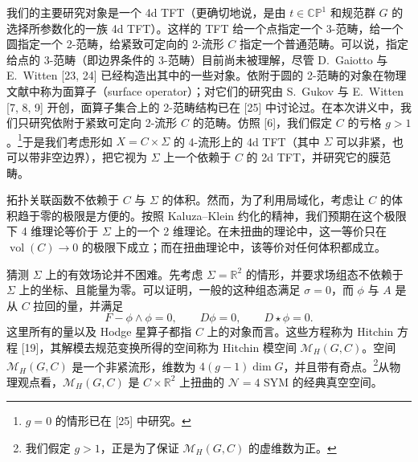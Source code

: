 \documentclass[11pt,a4paper,UTF8]{ctexart}
\begin{document}
我们的主要研究对象是一个 4d TFT（更确切地说，是由 $t\in\mathbb{CP}^{1}$ 和规范群 $G$ 的选择所参数化的一族 4d TFT）。这样的 TFT 给一个点指定一个 3-范畴，给一个圆指定一个 2-范畴，给紧致可定向的 2-流形 $C$ 指定一个普通范畴。可以说，指定给点的 3-范畴（即边界条件的 3-范畴）目前尚未被理解，尽管 D.~Gaiotto 与 E.~Witten [23, 24] 已经构造出其中的一些对象。依附于圆的 2-范畴的对象在物理文献中称为面算子（surface operator）；对它们的研究由 S.~Gukov 与 E.~Witten [7, 8, 9] 开创，面算子集合上的 2-范畴结构已在 [25] 中讨论过。在本次讲义中，我们只研究依附于紧致可定向 2-流形 $C$ 的范畴。仿照 [6]，我们假定 $C$ 的亏格 $g>1$。\footnote{$g=0$ 的情形已在 [25] 中研究。}于是我们考虑形如 $X=C\times\Sigma$ 的 4-流形上的 4d TFT（其中 $\Sigma$ 可以非紧，也可以带非空边界），把它视为 $\Sigma$ 上一个依赖于 $C$ 的 2d TFT，并研究它的膜范畴。


拓扑关联函数不依赖于 $C$ 与 $\Sigma$ 的体积。然而，为了利用局域化，考虑让 $C$ 的体积趋于零的极限是方便的。按照 Kaluza--Klein 约化的精神，我们预期在这个极限下 4 维理论等价于 $\Sigma$ 上的一个 2 维理论。在未扭曲的理论中，这一等价只在 $\operatorname{vol}(C)\to0$ 的极限下成立；而在扭曲理论中，该等价对任何体积都成立。


猜测 $\Sigma$ 上的有效场论并不困难。先考虑 $\Sigma=\mathbb{R}^{2}$ 的情形，并要求场组态不依赖于 $\Sigma$ 上的坐标、且能量为零。可以证明，一般的这种组态满足 $\sigma=0$，而 $\phi$ 与 $A$ 是从 $C$ 拉回的量，并满足
\[
    F-\phi\wedge\phi=0,\qquad D\phi=0,\qquad D\star\phi=0.
\]
这里所有的量以及 Hodge 星算子都指 $C$ 上的对象而言。这些方程称为 Hitchin 方程 [19]，其解模去规范变换所得的空间称为 Hitchin 模空间 $\mathcal{M}_{H}(G,C)$。空间 $\mathcal{M}_{H}(G,C)$ 是一个非紧流形，维数为 $4(g-1)\dim G$，并且带有奇点。\footnote{我们假定 $g>1$，正是为了保证 $\mathcal{M}_{H}(G,C)$ 的虚维数为正。}从物理观点看，$\mathcal{M}_{H}(G,C)$ 是 $C\times\mathbb{R}^{2}$ 上扭曲的 $\mathcal{N}=4$ SYM 的经典真空空间。
\end{document}
